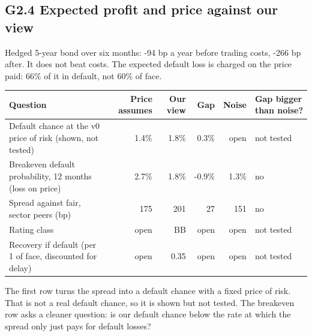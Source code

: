\documentclass[11pt,a4paper]{article}
\begin{document}
\subsection*{G2.4 Expected profit and price against our view}
Hedged 5-year bond over six months: -94 bp a year before trading costs, -266 bp after. It does not beat costs. The expected default loss is charged on the price paid: 66\% of it in default, not 60\% of face.
\begin{center}\footnotesize\setlength{\tabcolsep}{3.5pt}\begin{tabular}{@{}p{5.2cm}rrrrl@{}}\toprule
Question & Price assumes & Our view & Gap & Noise & Gap bigger than noise? \\\midrule
Default chance at the v0 price of risk (shown, not tested) & 1.4\% & 1.8\% & 0.3\% & open & not tested \\
Breakeven default probability, 12 months (loss on price) & 2.7\% & 1.8\% & -0.9\% & 1.3\% & no \\
Spread against fair, sector peers (bp) & 175 & 201 & 27 & 151 & no \\
Rating class & open & BB & open & open & not tested \\
Recovery if default (per 1 of face, discounted for delay) & open & 0.35 & open & open & not tested \\
\bottomrule\end{tabular}\end{center}
The first row turns the spread into a default chance with a fixed price of risk. That is not a real default chance, so it is shown but not tested. The breakeven row asks a cleaner question: is our default chance below the rate at which the spread only just pays for default losses?
\end{document}
